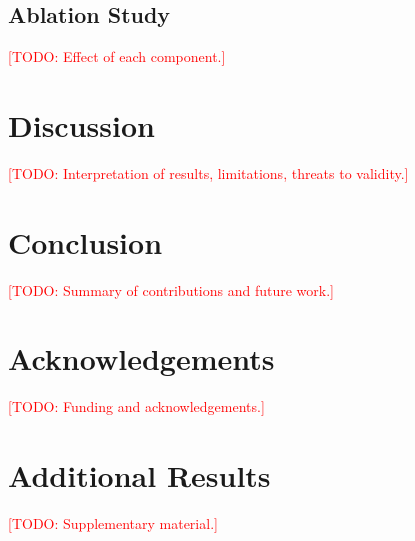 \documentclass[11pt,a4paper]{article}
\theoremstyle{definition}
\newcommand{\todo}[1]{\textcolor{red}{[TODO: #1]}}
\begin{document}
\subsection{Ablation Study}
\todo{Effect of each component.}

\section{Discussion}
\label{sec:discussion}
\todo{Interpretation of results, limitations, threats to validity.}

\section{Conclusion}
\label{sec:conclusion}
\todo{Summary of contributions and future work.}

\section*{Acknowledgements}
\todo{Funding and acknowledgements.}




\appendix
\section{Additional Results}
\label{app:extra}
\todo{Supplementary material.}
\end{document}
